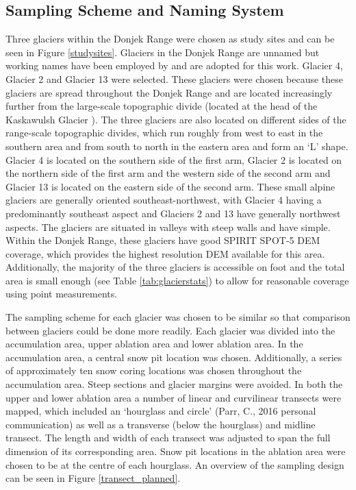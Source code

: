\documentclass{sfuthesis}
\begin{document}
\subsection{Sampling Scheme and Naming System}

Three glaciers within the Donjek Range were chosen as study sites and can be seen in Figure \ref{studysites}. Glaciers in the Donjek Range are unnamed but working names have been employed by \cite{Crompton2016} and are adopted for this work. Glacier 4, Glacier 2 and Glacier 13 were selected. These glaciers were chosen because these glaciers are spread throughout the Donjek Range and are located increasingly further from the large-scale topographic divide (located at the head of the Kaskawulsh Glacier \citep{Taylor1969}). The three glaciers are also located on different sides of the range-scale topographic divides, which run roughly from west to east in the southern area and from south to north in the eastern area and form an `L' shape. Glacier 4 is located on the southern side of the first arm, Glacier 2 is located on the northern side of the first arm and the western side of the second arm and Glacier 13 is located on the eastern side of the second arm. These small alpine glaciers are generally oriented southeast-northwest, with Glacier 4 having a predominantly southeast aspect and Glaciers 2 and 13 have generally northwest aspects. The glaciers are situated in valleys with steep walls and have simple. Within the Donjek Range, these glaciers have good SPIRIT SPOT-5 DEM coverage, which provides the highest resolution DEM available for this area. Additionally, the majority of the three glaciers is accessible on foot and the total area is small enough (see Table \ref{tab:glacierstats}) to allow for reasonable coverage using point measurements.

The sampling scheme for each glacier was chosen to be similar so that comparison between glaciers could be done more readily. Each glacier was divided into the accumulation area, upper ablation area and lower ablation area. In the accumulation area, a central snow pit location was chosen. Additionally, a series of approximately ten snow coring locations was chosen throughout the accumulation area. Steep sections and glacier margins were avoided. In both the upper and lower ablation area a number of linear and curvilinear transects were mapped, which included an `hourglass and circle' (Parr, C., 2016 personal communication) as well as a transverse (below the hourglass) and midline transect. The length and width of each transect was adjusted to span the full dimension of its corresponding area. Snow pit locations in the ablation area were chosen to be at the centre of each hourglass. An overview of the sampling design can be seen in Figure \ref{transect_planned}.
\end{document}
